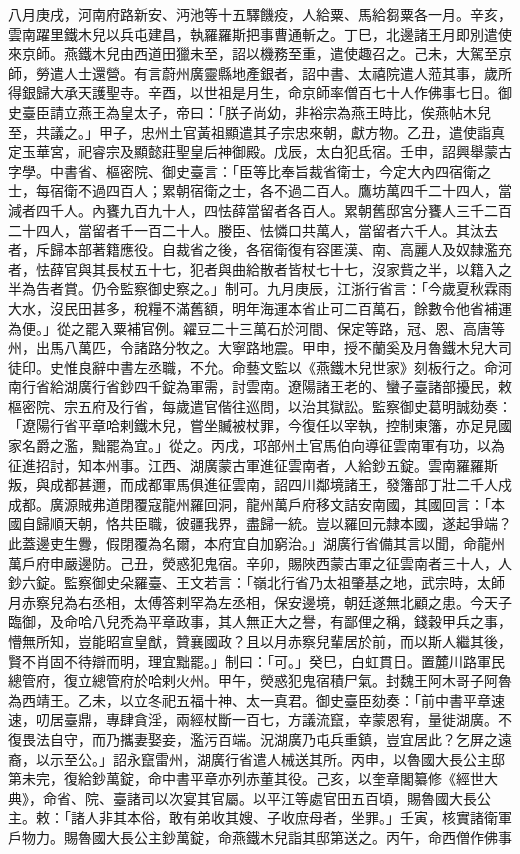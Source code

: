 \begin{pinyinscope}
 八月庚戌，河南府路新安、沔池等十五驛饑疫，人給粟、馬給芻粟各一月。辛亥，雲南躍里鐵木兒以兵屯建昌，執羅羅斯把事曹通斬之。丁巳，北邊諸王月即別遣使來京師。燕鐵木兒由西道田獵未至，詔以機務至重，遣使趣召之。己未，大駕至京師，勞遣人士還營。有言蔚州廣靈縣地產銀者，詔中書、太禧院遣人蒞其事，歲所得銀歸大承天護聖寺。辛酉，以世祖是月生，命京師率僧百七十人作佛事七日。御史臺臣請立燕王為皇太子，帝曰：「朕子尚幼，非裕宗為燕王時比，俟燕帖木兒至，共議之。」甲子，忠州土官黃祖顯遣其子宗忠來朝，獻方物。乙丑，遣使詣真定玉華宮，祀睿宗及顯懿莊聖皇后神御殿。戊辰，太白犯氐宿。壬申，詔興舉蒙古字學。中書省、樞密院、御史臺言：「臣等比奉旨裁省衛士，今定大內四宿衛之士，每宿衛不過四百人；累朝宿衛之士，各不過二百人。鷹坊萬四千二十四人，當減者四千人。內饔九百九十人，四怯薛當留者各百人。累朝舊邸宮分饔人三千二百二十四人，當留者千一百二十人。媵臣、怯憐口共萬人，當留者六千人。其汰去者，斥歸本部著籍應役。自裁省之後，各宿衛復有容匿漢、南、高麗人及奴隸濫充者，怯薛官與其長杖五十七，犯者與曲給散者皆杖七十七，沒家貲之半，以籍入之半為告者賞。仍令監察御史察之。」制可。九月庚辰，江浙行省言：「今歲夏秋霖雨大水，沒民田甚多，稅糧不滿舊額，明年海運本省止可二百萬石，餘數令他省補運為便。」從之罷入粟補官例。糴豆二十三萬石於河間、保定等路，冠、恩、高唐等州，出馬八萬匹，令諸路分牧之。大寧路地震。甲申，授不蘭奚及月魯鐵木兒大司徒印。史惟良辭中書左丞職，不允。命藝文監以《燕鐵木兒世家》刻板行之。命河南行省給湖廣行省鈔四千錠為軍需，討雲南。遼陽諸王老的、蠻子臺諸部擾民，敕樞密院、宗五府及行省，每歲遣官偕往巡問，以治其獄訟。監察御史葛明誠劾奏：「遼陽行省平章哈剌鐵木兒，嘗坐贓被杖罪，今復任以宰執，控制東籓，亦足見國家名爵之濫，黜罷為宜。」從之。丙戌，邛部州土官馬伯向導征雲南軍有功，以為征進招討，知本州事。江西、湖廣蒙古軍進征雲南者，人給鈔五錠。雲南羅羅斯叛，與成都甚邇，而成都軍馬俱進征雲南，詔四川鄰境諸王，發籓部丁壯二千人戍成都。廣源賊弗道閉覆寇龍州羅回洞，龍州萬戶府移文詰安南國，其國回言：「本國自歸順天朝，恪共臣職，彼疆我界，盡歸一統。豈以羅回元隸本國，遂起爭端？此蓋邊吏生釁，假閉覆為名爾，本府宜自加窮治。」湖廣行省備其言以聞，命龍州萬戶府申嚴邊防。己丑，熒惑犯鬼宿。辛卯，賜陜西蒙古軍之征雲南者三十人，人鈔六錠。監察御史朵羅臺、王文若言：「嶺北行省乃太祖肇基之地，武宗時，太師月赤察兒為右丞相，太傅答剌罕為左丞相，保安邊境，朝廷遂無北顧之患。今天子臨御，及命哈八兒禿為平章政事，其人無正大之譽，有鄙俚之稱，錢穀甲兵之事，懵無所知，豈能昭宣皇猷，贊襄國政？且以月赤察兒輩居於前，而以斯人繼其後，賢不肖固不待辯而明，理宜黜罷。」制曰：「可。」癸巳，白虹貫日。置麓川路軍民總管府，復立總管府於哈剌火州。甲午，熒惑犯鬼宿積尸氣。封魏王阿木哥子阿魯為西靖王。乙未，以立冬祀五福十神、太一真君。御史臺臣劾奏：「前中書平章速速，叨居臺鼎，專肆貪淫，兩經杖斷一百七，方議流竄，幸蒙恩宥，量徙湖廣。不復畏法自守，而乃攜妻娶妾，濫污百端。況湖廣乃屯兵重鎮，豈宜居此？乞屏之遠裔，以示至公。」詔永竄雷州，湖廣行省遣人械送其所。丙申，以魯國大長公主邸第未完，復給鈔萬錠，命中書平章亦列赤董其役。己亥，以奎章閣纂修《經世大典》，命省、院、臺諸司以次宴其官屬。以平江等處官田五百頃，賜魯國大長公主。敕：「諸人非其本俗，敢有弟收其嫂、子收庶母者，坐罪。」壬寅，核實諸衛軍戶物力。賜魯國大長公主鈔萬錠，命燕鐵木兒詣其邸第送之。丙午，命西僧作佛事
\end{pinyinscope}
